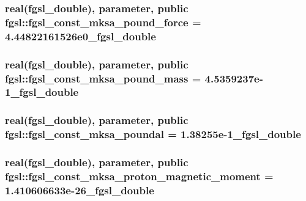 \hypertarget{classfgsl_af568f44c87cf706dcc1fe887c5a68604}{
\subsubsection[{fgsl\-\_\-const\-\_\-mksa\-\_\-pound\-\_\-force}]{\setlength{\rightskip}{0pt plus 5cm}real({\bf fgsl\-\_\-double}), parameter, public fgsl\-::fgsl\-\_\-const\-\_\-mksa\-\_\-pound\-\_\-force = 4.\-44822161526e0\-\_\-fgsl\-\_\-double}}\label{classfgsl_af568f44c87cf706dcc1fe887c5a68604}
\hypertarget{classfgsl_ad3cb7ad76502d5665ed74c2306e2b5f2}{
\subsubsection[{fgsl\-\_\-const\-\_\-mksa\-\_\-pound\-\_\-mass}]{\setlength{\rightskip}{0pt plus 5cm}real({\bf fgsl\-\_\-double}), parameter, public fgsl\-::fgsl\-\_\-const\-\_\-mksa\-\_\-pound\-\_\-mass = 4.\-5359237e-\/1\-\_\-fgsl\-\_\-double}}\label{classfgsl_ad3cb7ad76502d5665ed74c2306e2b5f2}
\hypertarget{classfgsl_a6679d0f4bba1852ff847f920c8f8ad2b}{
\subsubsection[{fgsl\-\_\-const\-\_\-mksa\-\_\-poundal}]{\setlength{\rightskip}{0pt plus 5cm}real({\bf fgsl\-\_\-double}), parameter, public fgsl\-::fgsl\-\_\-const\-\_\-mksa\-\_\-poundal = 1.\-38255e-\/1\-\_\-fgsl\-\_\-double}}\label{classfgsl_a6679d0f4bba1852ff847f920c8f8ad2b}
\hypertarget{classfgsl_a11b01d727e4e01028200e21ced0e16c2}{
\subsubsection[{fgsl\-\_\-const\-\_\-mksa\-\_\-proton\-\_\-magnetic\-\_\-moment}]{\setlength{\rightskip}{0pt plus 5cm}real({\bf fgsl\-\_\-double}), parameter, public fgsl\-::fgsl\-\_\-const\-\_\-mksa\-\_\-proton\-\_\-magnetic\-\_\-moment = 1.\-410606633e-\/26\-\_\-fgsl\-\_\-double}}\label{classfgsl_a11b01d727e4e01028200e21ced0e16c2}
